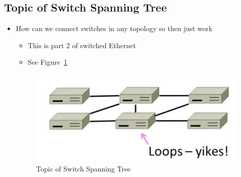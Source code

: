\documentclass[12pt]{ctexart}   %
\begin{document}
	\subsection{Topic of Switch Spanning Tree }
	\begin{itemize}
		\item How can we connect switches in any topology so then just work
		\begin{itemize}
			\item This is part 2 of switched Ethernet
			\item See Figure~\ref{fig:3-8-1}
		\end{itemize}
		
		\begin{figure}[h!] %
		\centering
		 \includegraphics[scale=0.7]{images/3-8-1}
		\caption{ Topic of Switch Spanning Tree }
		 \label{fig:3-8-1}
		 \end{figure}
	\end{itemize}
	
\end{document}
